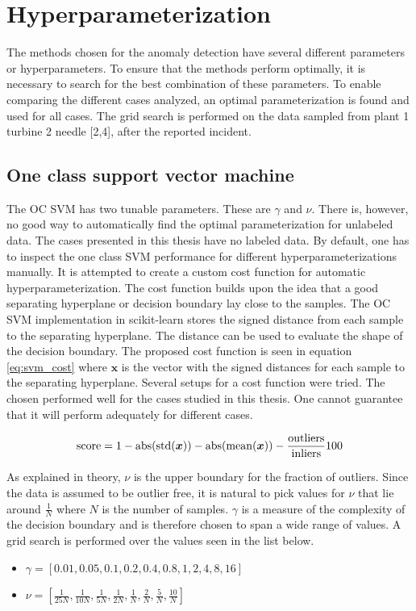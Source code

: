     \section{Hyperparameterization}
        The methods chosen for the anomaly detection have several different parameters or hyperparameters. To ensure that the methods perform optimally, it is necessary to search for the best combination of these parameters. To enable comparing the different cases analyzed, an optimal parameterization is found and used for all cases. The grid search is performed on the data sampled from plant 1 turbine 2 needle [2,4], after the reported incident. 
            \subsection{One class support vector machine}
                The OC SVM has two tunable parameters. These are $\gamma$ and $\nu$. There is, however, no good way to automatically find the optimal parameterization for unlabeled data. The cases presented in this thesis have no labeled data. By default, one has to inspect the one class SVM performance for different hyperparameterizations manually. It is attempted to create a custom cost function for automatic hyperparameterization. The cost function builds upon the idea that a good separating hyperplane or decision boundary lay close to the samples. The OC SVM implementation in scikit-learn stores the signed distance from each sample to the separating hyperplane. The distance can be used to evaluate the shape of the decision boundary. The proposed cost function is seen in equation \ref{eq:svm_cost} where $\bm{x}$ is the vector with the signed distances for each sample to the separating hyperplane. Several setups for a cost function were tried. The chosen performed well for the cases studied in this thesis. One cannot guarantee that it will perform adequately for different cases.  
                
                \begin{align}
                    \operatorname{score} = 1 - \operatorname{abs}(\operatorname{std}(\bm{x})) - \operatorname{abs}(\operatorname{mean}(\bm{x})) -\frac{\operatorname{outliers}}{\operatorname{inliers}}100
                    \label{eq:svm_cost}
                \end{align}
            
                As explained in theory, $\nu$ is the upper boundary for the fraction of outliers. Since the data is assumed to be outlier free, it is natural to pick values for $\nu$ that lie around $\frac{1}{N}$ where $N$ is the number of samples. $\gamma$ is a measure of the complexity of the decision boundary and is therefore chosen to span a wide range of values. A grid search is performed over the values seen in the list below. 
                \begin{itemize}
                    \item $\gamma =  [0.01,0.05,0.1,0.2,0.4,0.8,1,2,4,8,16]$
                    \item $\nu = [\frac{1}{25N}, \frac{1}{10N},\frac{1}{5N},\frac{1}{2N},\frac{1}{N},\frac{2}{N},\frac{5}{N},\frac{10}{N}]$
                    \label{list:svm_grid}
                \end{itemize}
                

